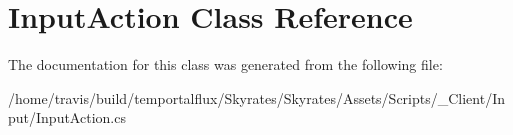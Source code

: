 \hypertarget{class_input_action}{\section{Input\-Action Class Reference}
\label{class_input_action}
}


The documentation for this class was generated from the following file\-:\begin{DoxyCompactItemize}
\item 
/home/travis/build/temportalflux/\-Skyrates/\-Skyrates/\-Assets/\-Scripts/\-\_\-\-Client/\-Input/Input\-Action.\-cs\end{DoxyCompactItemize}
